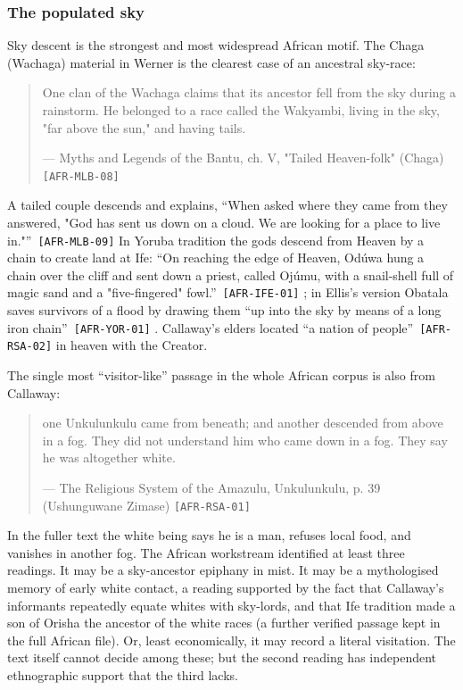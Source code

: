 \documentclass[11pt,a4paper]{article}
\newcommand{\pid}[1]{\texttt{\small #1}}
\begin{document}
\subsubsection{The populated sky}

Sky descent is the strongest and most widespread African motif. The Chaga (Wachaga) material in Werner is the clearest case of an ancestral sky-race: 
\begin{quote}\small One clan of the Wachaga claims that its ancestor fell from the sky during a rainstorm. He belonged to a race called the Wakyambi, living in the sky, "far above the sun," and having tails.\par\hfill{\footnotesize --- Myths and Legends of the Bantu, ch. V, "Tailed Heaven-folk" (Chaga) \pid{[AFR-MLB-08]}}\end{quote}
 A tailed couple descends and explains, \enquote{When asked where they came from they answered, "God has sent us down on a cloud. We are looking for a place to live in."}~\pid{[AFR-MLB-09]} In Yoruba tradition the gods descend from Heaven by a chain to create land at Ife: \enquote{On reaching the edge of Heaven, Odúwa hung a chain over the cliff and sent down a priest, called Ojúmu, with a snail-shell full of magic sand and a "five-fingered" fowl.}~\pid{[AFR-IFE-01]} \parencite{wyndham1921ife}; in Ellis's version Obatala saves survivors of a flood by drawing them \enquote{up into the sky by means of a long iron chain}~\pid{[AFR-YOR-01]} \parencite{ellis1894yoruba}. Callaway's elders located \enquote{a nation of people}~\pid{[AFR-RSA-02]} in heaven with the Creator.

The single most ``visitor-like'' passage in the whole African corpus is also from Callaway:

\begin{quote}\small one Unkulunkulu came from beneath; and another descended from above in a fog. They did not understand him who came down in a fog. They say he was altogether white.\par\hfill{\footnotesize --- The Religious System of the Amazulu, Unkulunkulu, p. 39 (Ushunguwane Zimase) \pid{[AFR-RSA-01]}}\end{quote}

In the fuller text the white being says he is a man, refuses local food, and vanishes in another fog. The African workstream identified at least three readings. It may be a sky-ancestor epiphany in mist. It may be a mythologised memory of early white contact, a reading supported by the fact that Callaway's informants repeatedly equate whites with sky-lords, and that Ife tradition made a son of Orisha the ancestor of the white races (a further verified passage kept in the full African file). Or, least economically, it may record a literal visitation. The text itself cannot decide among these; but the second reading has independent ethnographic support that the third lacks.
\end{document}
